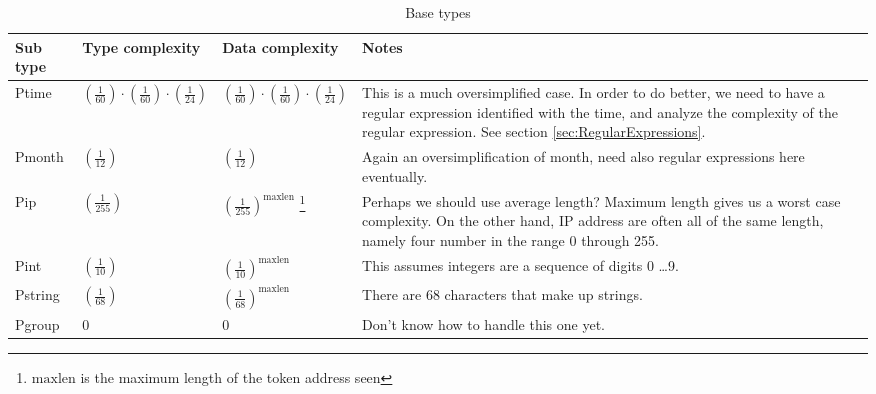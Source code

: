 \newpage
\begin{longtable}{||l|l|l|l|}
\caption[Base types]{Base types}
\label{tab:v2Base}
\\\hline
\hline
Sub type & Type complexity & Data complexity & Notes \\\hline\hline

\textsf{Ptime} &
      $\left(\frac{1}{60}\right) \cdot \left(\frac{1}{60}\right) \cdot \left(\frac{1}{24}\right)$ &
      $\left(\frac{1}{60}\right) \cdot \left(\frac{1}{60}\right) \cdot \left(\frac{1}{24}\right)$ &
\parbox[t]{5cm}{
This is a much oversimplified case. In order to do better, we need to
have a regular expression identified with the time, and analyze the
complexity of the regular expression. See section
\ref{sec:RegularExpressions}.
\vspace{0.5mm}} \\\hline

\textsf{Pmonth} & $\left(\frac{1}{12}\right)$ & $\left(\frac{1}{12}\right)$ &
\parbox[t]{5cm}{
Again an oversimplification of month, need also regular expressions here
eventually.
\vspace{0.5mm}} \\\hline

\textsf{Pip} &
    $\left(\frac{1}{255}\right)$ &
    $\left(\frac{1}{255}\right)^\mathrm{maxlen}$
\footnote{$\mathrm{maxlen}$ is the maximum length of the token address seen} &
\parbox[t]{5cm}{
Perhaps we should use average length? Maximum length gives us a worst
case complexity. On the other hand, IP address are often all of the same
length, namely four number in the range 0 through 255.
\vspace{0.5mm}} \\\hline

\textsf{Pint} &
    $\left(\frac{1}{10}\right)$ &
    $\left(\frac{1}{10}\right)^\mathrm{maxlen}$ &
\parbox[t]{5cm}{
This assumes integers are a sequence of digits 0 \ldots 9.
\vspace{0.5mm}} \\\hline

\textsf{Pstring} &
    $\left(\frac{1}{68}\right)$ &
    $\left(\frac{1}{68}\right)^\mathrm{maxlen}$ &
\parbox[t]{5cm}{
There are 68 characters that make up strings.
\vspace{0.5mm}} \\\hline

\textsf{Pgroup} & 0 & 0 &
\parbox[t]{5cm}{
Don't know how to handle this one yet.
\vspace{0.5mm}} \\\hline


\end{longtable}
